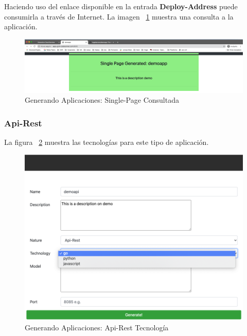 \documentclass[a4paper,11pt]{book}
\begin{document}
~\\
~\\


 Haciendo uso del enlace disponible en la entrada \textbf{Deploy-Address} puede consumirla a través de Internet. La imagen ~\ref{17} muestra una consulta a  la aplicación. 

\begin{figure}[H]
\centering
\includegraphics[scale=0.2]{imagenes/casouso_a/17.png}
\caption{  Generando Aplicaciones: Single-Page Consultada }
\label{17}
\end{figure}

\newpage
\subsubsection{Api-Rest}

La figura ~\ref{18} muestra las tecnologías para este tipo de aplicación. 

\begin{figure}[H]
\centering
\includegraphics[scale=0.4]{imagenes/casouso_a/18.png}
\caption{  Generando Aplicaciones: Api-Rest Tecnología }
\label{18}
\end{figure}
\end{document}
